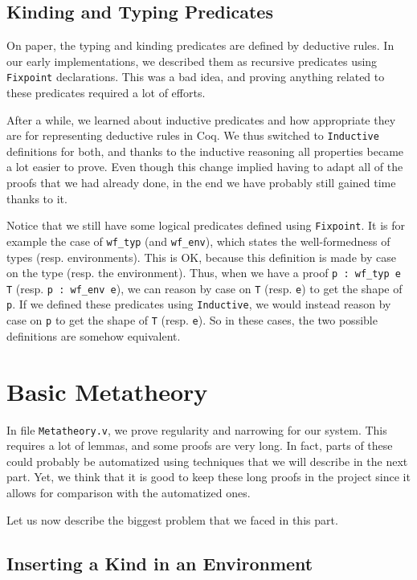 \documentclass[a4paper,11pt]{article}
\begin{document}
\subsection*{Kinding and Typing Predicates}

On paper, the typing and kinding predicates are defined by deductive
rules. In our early implementations, we described them as recursive
predicates using \verb|Fixpoint| declarations. This was a bad idea,
and proving anything related to these predicates required a lot
of efforts.

After a while, we learned about inductive predicates and how
appropriate they are for representing deductive rules in Coq. We thus
switched to \verb|Inductive| definitions for both, and thanks to the
inductive reasoning all properties became a lot easier to prove. Even
though this change implied having to adapt all of the proofs that we
had already done, in the end we have probably still gained time thanks
to it.

Notice that we still have some logical predicates defined using
\verb|Fixpoint|. It is for example the case of \verb|wf_typ| (and
\verb|wf_env|), which states the well-formedness of types
(resp. environments). This is OK, because this definition is made
by case on the type (resp. the environment). Thus, when we have a
proof \verb|p : wf_typ e T| (resp. \verb|p : wf_env e|),
we can reason by case on \verb|T| (resp. \verb|e|) to get the
shape of \verb|p|. If we defined these predicates using
\verb|Inductive|, we would instead reason by case on \verb|p| to get
the shape of \verb|T| (resp. \verb|e|). So in these cases, the two
possible definitions are somehow equivalent.

\section{Basic Metatheory}

In file \verb|Metatheory.v|, we prove regularity and narrowing for our
system. This requires a lot of lemmas, and some proofs are very
long. In fact, parts of these could probably be automatized using
techniques that we will describe in the next part. Yet, we think that
it is good to keep these long proofs in the project since it allows
for comparison with the automatized ones.

Let us now describe the biggest problem that we faced in this part.

\subsection*{Inserting a Kind in an Environment}
\end{document}
